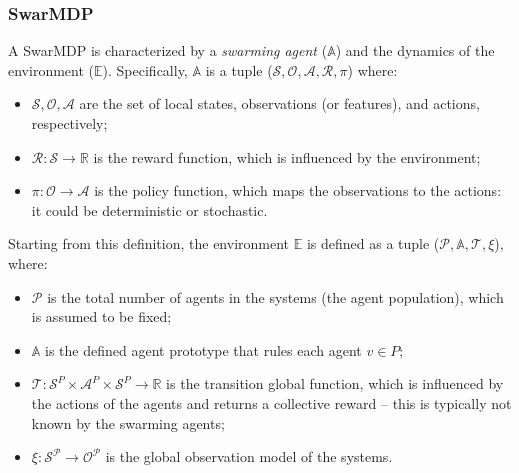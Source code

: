 \subsubsection{SwarMDP}
A SwarMDP is characterized by a \emph{swarming agent} ($\mathbb{A}$) and the dynamics of the environment ($\mathbb{E}$).
Specifically, $\mathbb{A}$ is a tuple ($\mathcal{S}, \mathcal{O}, \mathcal{A}, \mathcal{R}, \pi$) where:
\begin{itemize}
  \item $\mathcal{S, O, A}$ are the set of local states, observations (or features), and actions, respectively;
  \item $\mathcal{R}: \mathcal{S} \rightarrow \mathbb{R}$ is the reward function, which is influenced by the environment;
  \item $\pi: \mathcal{O} \rightarrow \mathcal{A}$ is the policy function, which maps the observations to the actions: it could be deterministic or stochastic.
\end{itemize}
Starting from this definition, the environment $\mathbb{E}$ is defined as a tuple ($\mathcal{P}, \mathbb{A}, \mathcal{T}, \xi$), where:
\begin{itemize}
  \item $\mathcal{P}$ is the total number of agents in the systems (the agent population), which is assumed to be fixed;
  \item $\mathbb{A}$ is the defined agent prototype that rules each agent $v \in P$;
  \item $\mathcal{T}: \mathcal{S}^P \times \mathcal{A}^P \times \mathcal{S}^P \rightarrow \mathbb{R}$ is the transition  global function, which is influenced by the actions of the agents and returns a collective reward -- this is typically not known by the swarming agents;
  \item $\xi: \mathcal{S^P} \rightarrow \mathcal{O^P}$ is the global observation model of the systems.
\end{itemize}

